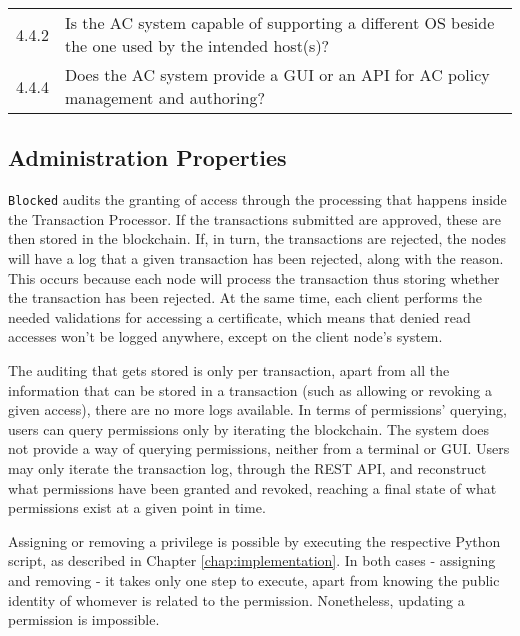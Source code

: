 {\begin{table}[h]
\begin{tabular}{l|l}
		\hline \rowcolor{lightgray} \multicolumn{2}{l}{Support Properties}                                                                         \\ \hline
		4.4.2              & \llap{\textbullet} Is the AC system capable of supporting a different OS beside the one used by the intended host(s)? \\ \hline
		4.4.4              & \llap{\textbullet} Does the AC system provide a GUI or an API for AC policy management and authoring?                 \\
		\hline
	\end{tabular}
\end{table}
}

\subsection{Administration Properties}

\texttt{Blocked} audits the granting of access through the processing that happens inside the Transaction Processor. If the transactions submitted are approved, these are then stored in the blockchain. If, in turn, the transactions are rejected, the nodes will have a log that a given transaction has been rejected, along with the reason. This occurs because each node will process the transaction thus storing whether the transaction has been rejected. At the same time, each client performs the needed validations for accessing a certificate, which means that denied read accesses won't be logged anywhere, except on the client node's system.

The auditing that gets stored is only per transaction, apart from all the information that can be stored in a transaction (such as allowing or revoking a given access), there are no more logs available.  In terms of permissions' querying, users can query permissions only by iterating the blockchain. The system does not provide a way of querying permissions, neither from a terminal or GUI. Users may only iterate the transaction log, through the REST API, and reconstruct what permissions have been granted and revoked, reaching a final state of what permissions exist at a given point in time.

Assigning or removing a privilege is possible by executing the respective Python script, as described in Chapter \ref{chap:implementation}. In both cases - assigning and removing - it takes only one step to execute, apart from knowing the public identity of whomever is related to the permission. Nonetheless, updating a permission is impossible.

